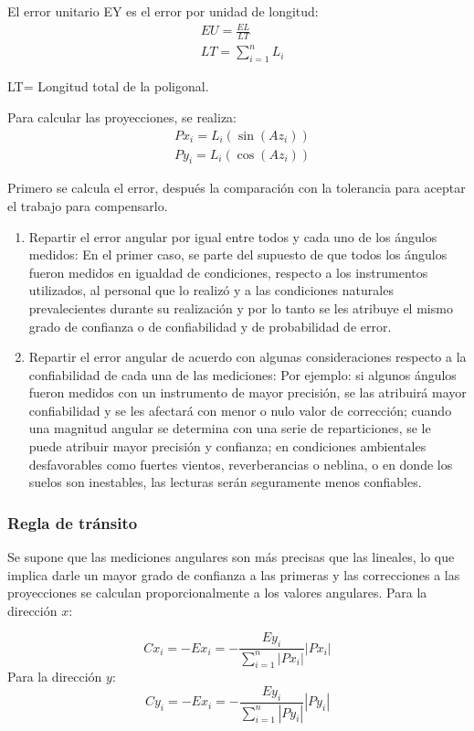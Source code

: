 El error unitario EY es el error por unidad de longitud:
\begin{align}
    &EU=\frac{EL}{LT}\\
    &LT=\sum_{i=1}^nL_i
\end{align}

LT= Longitud total de la poligonal.

Para calcular las proyecciones, se realiza:
\begin{align}
    &Px_i=L_i\left(\sin{(Az_i)}\right)\\
    &Py_i=L_i\left(\cos{(Az_i)}\right)
\end{align}

Primero se calcula el error, después la comparación con la tolerancia para aceptar el trabajo para compensarlo.
\begin{enumerate}
    \item Repartir el error angular por igual entre todos y cada uno de los ángulos medidos: En el primer caso, se parte del supuesto de que todos los ángulos fueron medidos en igualdad de condiciones, respecto a los instrumentos utilizados, al personal que lo realizó y a las condiciones naturales prevalecientes durante su realización y por lo tanto se les atribuye el mismo grado de confianza o de confiabilidad y de probabilidad de error.
    \item Repartir el error angular de acuerdo con algunas consideraciones respecto a la confiabilidad de cada una de las mediciones: Por ejemplo: si algunos ángulos fueron medidos con un instrumento de mayor precisión, se las atribuirá mayor confiabilidad y se les afectará con menor o nulo valor de corrección; cuando una magnitud angular se determina con una serie de reparticiones, se le puede atribuir mayor precisión y confianza; en condiciones ambientales desfavorables como fuertes vientos, reverberancias o neblina, o en donde los suelos son inestables, las lecturas serán seguramente menos confiables.
\end{enumerate}

\subsubsection{Regla de tránsito}
Se supone que las mediciones angulares son más precisas que las lineales, lo que implica darle un mayor grado de confianza a las primeras y las correcciones a las proyecciones se calculan proporcionalmente a los valores angulares.
Para la dirección $x$:

\begin{equation}
    Cx_i=-Ex_i=-\frac{Ey_i}{\sum_{i=1}^n\left\lvert Px_i\right\rvert}\left\lvert Px_i\right\rvert 
\end{equation}
Para la dirección $y$:
\begin{equation}
    Cy_i=-Ex_i=-\frac{Ey_i}{\sum_{i=1}^n\left\lvert Py_i\right\rvert}\left\lvert Py_i\right\rvert
\end{equation}

